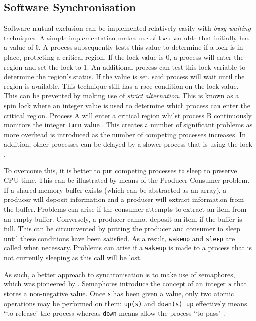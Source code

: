 \documentclass[12pt,a4paper,oneside]{article}
\def\code#1{\texttt{#1}}
\begin{document}
  \subsection{Software Synchronisation}
    Software mutual exclusion can be implemented relatively easily with \textit{busy-waiting} techniques. A simple implementation makes use of lock variable that initially has a value of 0. A process subsequently tests this value to determine if a lock is in place, protecting a critical region. If the lock value is 0, a process will enter the region and set the lock to 1. An additional process can test this lock variable to determine the region's status. If the value is set, said process will wait until the region is available. This technique still has a race condition on the lock value. This can be prevented by making use of \textit{strict alternation}. This is known as a spin lock where an integer value is used to determine which process can enter the critical region. Process A will enter a critical region whilst process B continuously monitors the integer \code{turn} value \citep{modernOS}. This creates a number of significant problems as more overhead is introduced as the number of competing processes increases. In addition, other processes can be delayed by a slower process that is using the lock \citep{spinlocks1994}.

    To overcome this, it is better to put competing processes to sleep to preserve CPU time. This can be illustrated by means of the Producer-Consumer problem. If a shared memory buffer exists (which can be abstracted as an array), a producer will deposit information and a producer will extract information from the buffer. Problems can arise if the consumer attempts to extract an item from an empty buffer. Conversely, a producer cannot deposit an item if the buffer is full. This can be circumvented by putting the producer and consumer to sleep until these conditions have been satisfied. As a result, \code{wakeup} and \code{sleep} are called when necessary. Problems can arise if a \code{wakeup} is made to a process that is not currently sleeping as this call will be lost.

    As such, a better approach to synchronisation is to make use of semaphores, which was pioneered by \cite{dijkstraSems}. Semaphores introduce the concept of an integer \code{s} that stores a non-negative value. Once \code{s} has been given a value, only two atomic operations may be performed on them: \code{up(s)} and \code{down(s)}. \code{up} effectively means ``to release" the process whereas \code{down} means allow the process ``to pass" \citep{trainBook}.
\end{document}
